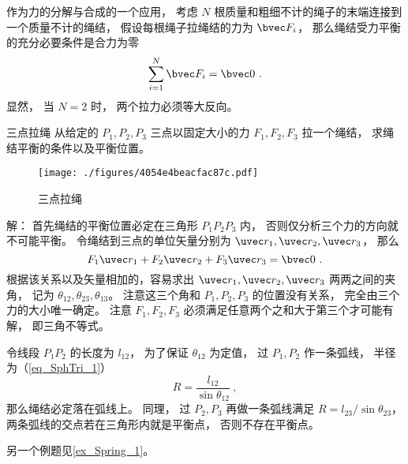 

作为力的分解与合成的一个应用， 考虑 $N$ 根质量和粗细不计的绳子的末端连接到一个质量不计的绳结， 假设每根绳子拉绳结的力为 $\bvec F_i$， 那么绳结受力平衡的充分必要条件是合力为零
\begin{equation}
\sum_{i=1}^N \bvec F_i = \bvec 0~.
\end{equation}
显然， 当 $N = 2$ 时， 两个拉力必须等大反向。

\begin{example}{三点拉绳}
从给定的 $P_1,P_2,P_3$ 三点以固定大小的力 $F_1, F_2, F_3$ 拉一个绳结， 求绳结平衡的条件以及平衡位置。
\begin{figure}[ht]
\centering
\texttt{[image: ./figures/4054e4beacfac87c.pdf]}
\caption{三点拉绳} \label{fig_Knot_1}
\end{figure}

解： 首先绳结的平衡位置必定在三角形 $P_1 P_2 P_3$ 内， 否则仅分析三个力的方向就不可能平衡。 令绳结到三点的单位矢量分别为 $\uvec r_1, \uvec r_2, \uvec r_3$， 那么
\begin{equation}
F_1 \uvec r_1 + F_2 \uvec r_2 + F_3 \uvec r_3 = \bvec 0~.
\end{equation}
根据该关系以及矢量相加的，容易求出 $\uvec r_1, \uvec r_2, \uvec r_3$ 两两之间的夹角， 记为 $\theta_{12}, \theta_{23}, \theta_{13}$。 注意这三个角和 $P_1, P_2, P_3$ 的位置没有关系， 完全由三个力的大小唯一确定。 注意 $F_1, F_2, F_3$ 必须满足任意两个之和大于第三个才可能有解， 即三角不等式。

令线段 $P_1P_2$ 的长度为 $l_{12}$， 为了保证 $\theta_{12}$ 为定值， 过 $P_1, P_2$ 作一条弧线， 半径为（\autoref{eq_SphTri_1}）
\begin{equation}
R = \frac{l_{12}}{\sin\theta_{12}}~,
\end{equation}
那么绳结必定落在弧线上。 同理， 过 $P_2, P_3$ 再做一条弧线满足 $R = l_{23}/\sin\theta_{23}$， 两条弧线的交点若在三角形内就是平衡点， 否则不存在平衡点。
\end{example}

另一个例题见\autoref{ex_Spring_1}。
